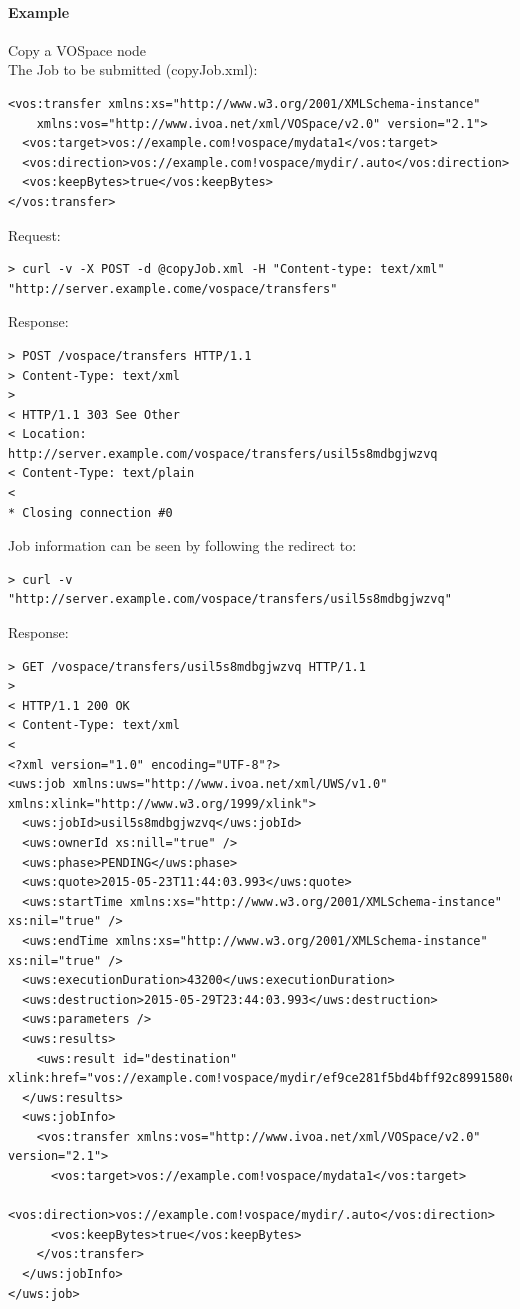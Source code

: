 \documentclass[11pt,a4paper]{ivoa}
\begin{document}
\paragraph{Example}
Copy a VOSpace node
\\[5px]
\noindent
The Job to be submitted (copyJob.xml):
\begin{lstlisting}
<vos:transfer xmlns:xs="http://www.w3.org/2001/XMLSchema-instance"
    xmlns:vos="http://www.ivoa.net/xml/VOSpace/v2.0" version="2.1">
  <vos:target>vos://example.com!vospace/mydata1</vos:target>
  <vos:direction>vos://example.com!vospace/mydir/.auto</vos:direction>
  <vos:keepBytes>true</vos:keepBytes>
</vos:transfer>
\end{lstlisting}
Request:
\begin{lstlisting}
> curl -v -X POST -d @copyJob.xml -H "Content-type: text/xml" "http://server.example.come/vospace/transfers"
\end{lstlisting}
Response:
\begin{lstlisting}
> POST /vospace/transfers HTTP/1.1
> Content-Type: text/xml
>
< HTTP/1.1 303 See Other
< Location: http://server.example.com/vospace/transfers/usil5s8mdbgjwzvq
< Content-Type: text/plain
<
* Closing connection #0
\end{lstlisting}
Job information can be seen by following the redirect to:
\begin{lstlisting}
> curl -v "http://server.example.com/vospace/transfers/usil5s8mdbgjwzvq"
\end{lstlisting}
Response:
\begin{lstlisting}
> GET /vospace/transfers/usil5s8mdbgjwzvq HTTP/1.1
>
< HTTP/1.1 200 OK
< Content-Type: text/xml
<
<?xml version="1.0" encoding="UTF-8"?>
<uws:job xmlns:uws="http://www.ivoa.net/xml/UWS/v1.0" xmlns:xlink="http://www.w3.org/1999/xlink">
  <uws:jobId>usil5s8mdbgjwzvq</uws:jobId>
  <uws:ownerId xs:nill="true" />
  <uws:phase>PENDING</uws:phase>
  <uws:quote>2015-05-23T11:44:03.993</uws:quote>
  <uws:startTime xmlns:xs="http://www.w3.org/2001/XMLSchema-instance" xs:nil="true" />
  <uws:endTime xmlns:xs="http://www.w3.org/2001/XMLSchema-instance" xs:nil="true" />
  <uws:executionDuration>43200</uws:executionDuration>
  <uws:destruction>2015-05-29T23:44:03.993</uws:destruction>
  <uws:parameters />
  <uws:results>
    <uws:result id="destination" xlink:href="vos://example.com!vospace/mydir/ef9ce281f5bd4bff92c8991580cddff4"/>
  </uws:results>
  <uws:jobInfo>
    <vos:transfer xmlns:vos="http://www.ivoa.net/xml/VOSpace/v2.0" version="2.1">
      <vos:target>vos://example.com!vospace/mydata1</vos:target>
      <vos:direction>vos://example.com!vospace/mydir/.auto</vos:direction>
      <vos:keepBytes>true</vos:keepBytes>
    </vos:transfer>
  </uws:jobInfo>
</uws:job>
\end{lstlisting}
\end{document}
